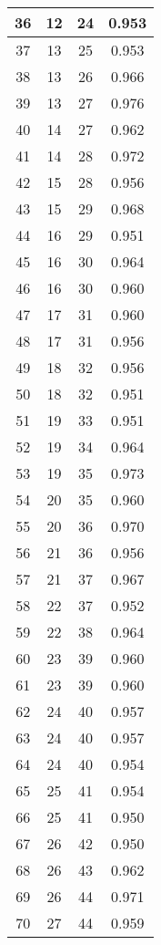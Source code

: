 \begin{table}
\begin{tabular}{|c|c|c|c|}
 36  & 12  & 24 & 0.953  \\ \hline
 37  & 13  & 25 & 0.953  \\ \hline
 38  & 13  & 26 & 0.966  \\ \hline
 39  & 13  & 27 & 0.976  \\ \hline
 40  & 14  & 27 & 0.962  \\ \hline
 41  & 14  & 28 & 0.972  \\ \hline
 42  & 15  & 28 & 0.956  \\ \hline
 43  & 15  & 29 & 0.968  \\ \hline
 44  & 16  & 29 & 0.951  \\ \hline
 45  & 16  & 30 & 0.964  \\ \hline
 46  & 16  & 30 & 0.960  \\ \hline
 47  & 17  & 31 & 0.960  \\ \hline
 48  & 17  & 31 & 0.956  \\ \hline
 49  & 18  & 32 & 0.956  \\ \hline
 50  & 18  & 32 & 0.951  \\ \hline
 51  & 19  & 33 & 0.951  \\ \hline
 52  & 19  & 34 & 0.964  \\ \hline
 53  & 19  & 35 & 0.973  \\ \hline
 54  & 20  & 35 & 0.960  \\ \hline
 55  & 20  & 36 & 0.970  \\ \hline
 56  & 21  & 36 & 0.956  \\ \hline
 57  & 21  & 37 & 0.967  \\ \hline
 58  & 22  & 37 & 0.952  \\ \hline
 59  & 22  & 38 & 0.964  \\ \hline
 60  & 23  & 39 & 0.960  \\ \hline
 61  & 23  & 39 & 0.960  \\ \hline
 62  & 24  & 40 & 0.957  \\ \hline
 63  & 24  & 40 & 0.957  \\ \hline
 64  & 24  & 40 & 0.954  \\ \hline
 65  & 25  & 41 & 0.954  \\ \hline
 66  & 25  & 41 & 0.950  \\ \hline
 67  & 26  & 42 & 0.950  \\ \hline
 68  & 26  & 43 & 0.962  \\ \hline
 69  & 26  & 44 & 0.971  \\ \hline
 70  & 27  & 44 & 0.959  \\ \hline

\end{tabular}
\end{table}
